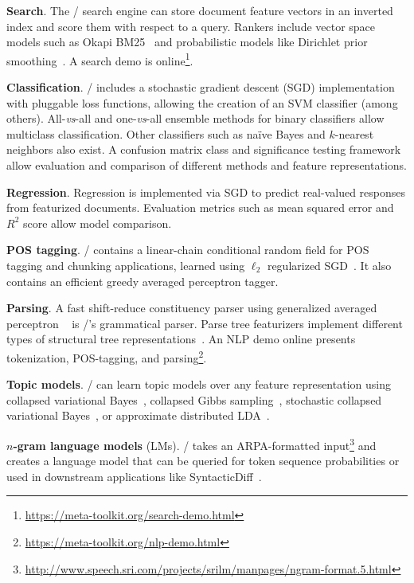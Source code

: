\textbf{Search}.
The \meta/ search engine can store document feature vectors in an inverted index
and score them with respect to a query. Rankers include vector space models such
as Okapi BM25~\cite{bm25} and probabilistic models like Dirichlet prior
smoothing~\cite{zhai-lm}. A search demo is
online\footnote{\url{https://meta-toolkit.org/search-demo.html}}.

\textbf{Classification}.
\meta/ includes a stochastic gradient descent (SGD) implementation with
pluggable loss functions, allowing the creation of an SVM classifier (among
others). All-\emph{vs}-all and one-\emph{vs}-all ensemble methods for binary
classifiers allow multiclass classification. Other classifiers such as na{\"i}ve
Bayes and $k$-nearest neighbors also exist. A confusion matrix class and
significance testing framework allow evaluation and comparison of different
methods and feature representations.

\textbf{Regression}.
Regression is implemented via SGD to predict real-valued responses from
featurized documents. Evaluation metrics such as mean squared error and $R^2$
score allow model comparison.

\textbf{POS tagging}.
\meta/ contains a linear-chain conditional random field for POS tagging and
chunking applications, learned using $\ell_2$ regularized SGD~\cite{crf}. It
also contains an efficient greedy averaged perceptron tagger.

\textbf{Parsing}.
A fast shift-reduce constituency parser using generalized averaged perceptron
~\cite{const-parsing} is \meta/'s grammatical parser. Parse tree featurizers
implement different types of structural tree representations~\cite{structural}.
An NLP demo online presents tokenization, POS-tagging, and
parsing\footnote{\url{https://meta-toolkit.org/nlp-demo.html}}.

\textbf{Topic models}.
\meta/ can learn topic models over any feature representation using collapsed
variational Bayes~\cite{cvb}, collapsed Gibbs sampling~\cite{gibbs}, stochastic
collapsed variational Bayes~\cite{scvb}, or approximate distributed
LDA~\cite{pargibbs}.

\textbf{$n$-gram language models} (LMs).
\meta/ takes an ARPA-formatted
input\footnote{\url{http://www.speech.sri.com/projects/srilm/manpages/ngram-format.5.html}}
and creates a language model that can be queried for token sequence
probabilities or used in downstream applications like
SyntacticDiff~\cite{syndiff}.

